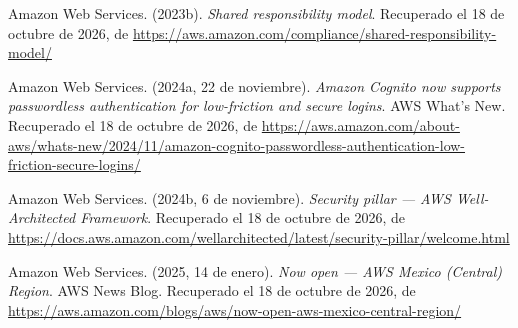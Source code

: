 \documentclass[12pt, a4paper]{article}
\begin{document}
\begin{list}{}{\setlength{\leftmargin}{1.27cm}\setlength{\itemindent}{-1.27cm}%
  \setlength{\labelwidth}{0pt}\setlength{\labelsep}{0pt}\setlength{\itemsep}{6pt}}

\item Amazon Web Services. (2023b). \textit{Shared responsibility model}. Recuperado el 18 de octubre de 2026, de \url{https://aws.amazon.com/compliance/shared-responsibility-model/}


\item Amazon Web Services. (2024a, 22 de noviembre). \textit{Amazon
  Cognito now supports passwordless authentication for low-friction
  and secure logins}. AWS What's New.
  Recuperado el 18 de octubre de 2026, de \url{https://aws.amazon.com/about-aws/whats-new/2024/11/amazon-cognito-passwordless-authentication-low-friction-secure-logins/}
 
 
\item Amazon Web Services. (2024b, 6 de noviembre). \textit{Security
  pillar --- AWS Well-Architected Framework}.
  Recuperado el 18 de octubre de 2026, de \url{https://docs.aws.amazon.com/wellarchitected/latest/security-pillar/welcome.html}
 

\item Amazon Web Services. (2025, 14 de enero). \textit{Now open ---
  AWS Mexico (Central) Region}. AWS News Blog.
  Recuperado el 18 de octubre de 2026, de \url{https://aws.amazon.com/blogs/aws/now-open-aws-mexico-central-region/}
 

\end{list}
\end{document}
